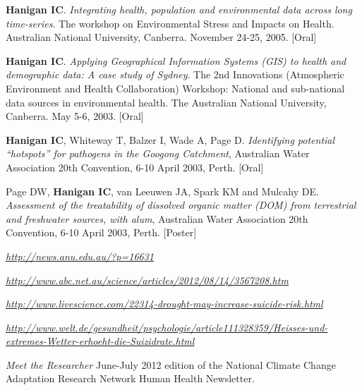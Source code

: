 \documentclass[a4paper,11pt]{article}
\begin{document}
\begin{revnumerate}
\item \textbf{Hanigan IC}. \emph{Integrating health, population and environmental data across long time-series}. The workshop on Environmental Stress and Impacts on Health. Australian National University, Canberra. November 24-25, 2005. [Oral]

\item \textbf{Hanigan IC}. \emph{Applying Geographical Information Systems (GIS) to health and demographic data: A case study of Sydney}. The 2nd Innovations (Atmospheric Environment and Health Collaboration) Workshop: National and sub-national data sources in environmental health. The Australian National University, Canberra. May 5-6, 2003. [Oral]

\item \textbf{Hanigan IC}, Whiteway T, Balzer I, Wade A, Page D. \emph{Identifying potential “hotspots” for pathogens in the Googong Catchment}, Australian Water Association 20th Convention, 6-10 April 2003, Perth. [Oral]

\item Page DW, \textbf{Hanigan IC}, van Leeuwen JA, Spark KM and Mulcahy DE.  \emph{Assessment of the treatability of dissolved organic matter (DOM) from terrestrial and freshwater sources, with alum}, Australian Water Association 20th Convention, 6-10 April 2003, Perth. [Poster]


\end{revnumerate}




\medskip
\renewcommand{\labelenumi}{\textsc{g}\theenumi.}
\begin{revnumerate}

\item \emph{\href{http://news.anu.edu.au/?p=16631}{http://news.anu.edu.au/?p=16631}}

\item \emph{\href{http://www.abc.net.au/science/articles/2012/08/14/3567208.htm}{http://www.abc.net.au/science/articles/2012/08/14/3567208.htm}}

\item \emph{\href{http://www.livescience.com/22314-drought-may-increase-suicide-risk.html}{http://www.livescience.com/22314-drought-may-increase-suicide-risk.html}}

\item \emph{\href{http://www.welt.de/gesundheit/psychologie/article111328359/Heisses-und-extremes-Wetter-erhoeht-die-Suizidrate.html}{http://www.welt.de/gesundheit/psychologie/article111328359/Heisses-und-extremes-Wetter-erhoeht-die-Suizidrate.html}}

\item \emph{Meet the Researcher} June-July 2012 edition of the National Climate Change Adaptation Research Network Human Health Newsletter.
\end{revnumerate}
\end{document}
